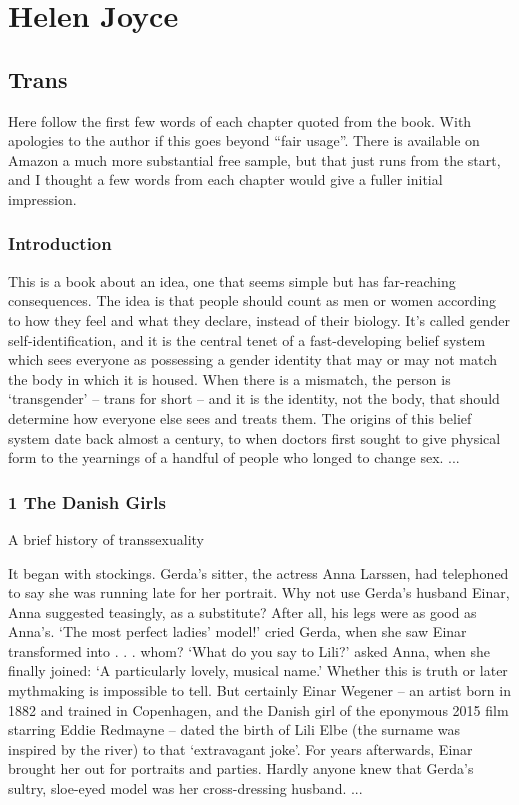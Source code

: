\documentclass[10pt,titlepage]{book}
\begin{document}
\section{Helen Joyce}

\subsection{Trans \cite{joyce2021}}
Here follow the first few words of each chapter quoted from the book.
With apologies to the author if this goes beyond ``fair usage''.
There is available on Amazon a much more substantial free sample, but that just runs from the start, and I thought a few words from each chapter would give a fuller initial impression.

\subsubsection{Introduction}

This is a book about an idea, one that seems simple but has far-reaching consequences. The idea is that people should count as men or women according to how they feel and what they declare, instead of their biology. It’s called gender self-identification, and it is the central tenet of a fast-developing belief system which sees everyone as possessing a gender identity that may or may not match the body in which it is housed. When there is a mismatch, the person is ‘transgender’ – trans for short – and it is the identity, not the body, that should determine how everyone else sees and treats them. The origins of this belief system date back almost a century, to when doctors first sought to give physical form to the yearnings of a handful of people who longed to change sex.
...

\subsubsection{1 The Danish Girls}

A brief history of transsexuality

It began with stockings. Gerda’s sitter, the actress Anna Larssen, had telephoned to say she was running late for her portrait. Why not use Gerda’s husband Einar, Anna suggested teasingly, as a substitute? After all, his legs were as good as Anna’s. ‘The most perfect ladies’ model!’ cried Gerda, when she saw Einar transformed into . . . whom? ‘What do you say to Lili?’ asked Anna, when she finally joined: ‘A particularly lovely, musical name.’ Whether this is truth or later mythmaking is impossible to tell. But certainly Einar Wegener – an artist born in 1882 and trained in Copenhagen, and the Danish girl of the eponymous 2015 film starring Eddie Redmayne – dated the birth of Lili Elbe (the surname was inspired by the river) to that ‘extravagant joke’. For years afterwards, Einar brought her out for portraits and parties. Hardly anyone knew that Gerda’s sultry, sloe-eyed model was her cross-dressing husband.
...
\end{document}
